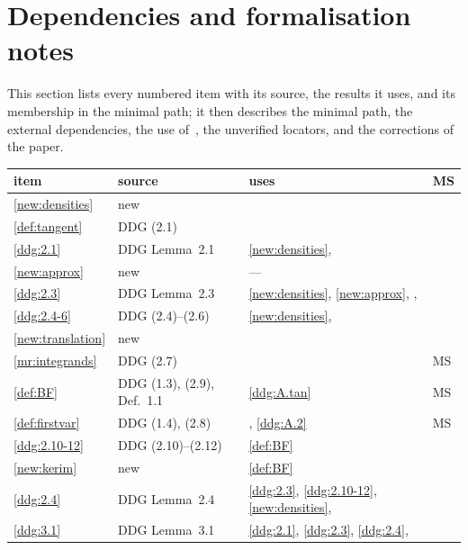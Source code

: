 \documentclass[a4paper,twoside,leqno]{article}
\begin{document}
\section{Dependencies and formalisation notes}
\label{sec:deps}

\begin{miniremark}
    \label{mr:deps}
    This section lists every numbered item with its source, the results it uses, and its
    membership in the minimal path; it then describes the minimal path, the external dependencies,
    the use of~\cite{Federer1969}, the unverified locators, and the corrections of the paper.
\end{miniremark}

\begingroup
\small
\setlength{\LTpre}{0pt}
\begin{longtable}{p{}p{}p{}l}
    item & source & uses & MS \\ \hline
    \endhead
    \ref{new:densities} & new & \cite[2.4.9]{Federer1969} & \\
    \ref{def:tangent} & DDG (2.1) & \cite[2.6(2)]{Allard1972} & \\
    \ref{ddg:2.1} & DDG Lemma~2.1 & \ref{new:densities}, \cite[2.6(2)(c)]{Allard1972} & \\
    \ref{new:approx} & new & --- & \\
    \ref{ddg:2.3} & DDG Lemma~2.3 & \ref{new:densities}, \ref{new:approx},
        \cite[3.3]{Allard1972}, \cite[2.8.18, 2.9.9]{Federer1969} & \\
    \ref{ddg:2.4-6} & DDG (2.4)--(2.6) & \ref{new:densities}, \cite[2.8.18, 2.9.11]{Federer1969} & \\
    \ref{new:translation} & new & \cite[2.4.9, 4.1.2]{Federer1969} & \\
    \ref{mr:integrands} & DDG (2.7) & \cite[3.1.22]{Federer1969} & MS \\
    \ref{def:BF} & DDG (1.3), (2.9), Def.~1.1 & \ref{ddg:A.tan} & MS \\
    \ref{def:firstvar} & DDG (1.4), (2.8) & \cite[4.1.5]{Federer1969}, \ref{ddg:A.2} & MS \\
    \ref{ddg:2.10-12} & DDG (2.10)--(2.12) & \ref{def:BF} & \\
    \ref{new:kerim} & new & \ref{def:BF} & \\
    \ref{ddg:2.4} & DDG Lemma~2.4 & \ref{ddg:2.3}, \ref{ddg:2.10-12}, \ref{new:densities},
        \cite[2.8.18, 2.9.5]{Federer1969} & \\
    \ref{ddg:3.1} & DDG Lemma~3.1 & \ref{ddg:2.1}, \ref{ddg:2.3}, \ref{ddg:2.4},

\end{longtable}
\end{document}
